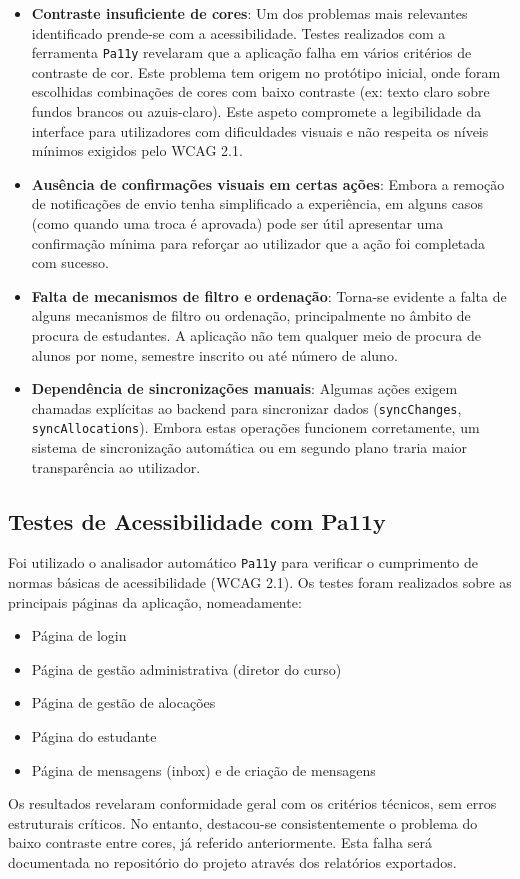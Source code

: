 \documentclass{article}
\begin{document}
\begin{itemize}
    \item \textbf{Contraste insuficiente de cores}: Um dos problemas mais relevantes identificado prende-se com a acessibilidade. Testes realizados com a ferramenta \texttt{Pa11y} revelaram que a aplicação falha em vários critérios de contraste de cor. Este problema tem origem no protótipo inicial, onde foram escolhidas combinações de cores com baixo contraste (ex: texto claro sobre fundos brancos ou azuis-claro). Este aspeto compromete a legibilidade da interface para utilizadores com dificuldades visuais e não respeita os níveis mínimos exigidos pelo WCAG 2.1.

    \item \textbf{Ausência de confirmações visuais em certas ações}: Embora a remoção de notificações de envio tenha simplificado a experiência, em alguns casos (como quando uma troca é aprovada) pode ser útil apresentar uma confirmação mínima para reforçar ao utilizador que a ação foi completada com sucesso.

    \item \textbf{Falta de mecanismos de filtro e ordenação}: Torna-se evidente a falta de alguns mecanismos de filtro ou ordenação, principalmente no âmbito de procura de estudantes. A aplicação não tem qualquer meio de procura de alunos por nome, semestre inscrito ou até número de aluno.

    \item \textbf{Dependência de sincronizações manuais}: Algumas ações exigem chamadas explícitas ao backend para sincronizar dados (\texttt{syncChanges}, \texttt{syncAllocations}). Embora estas operações funcionem corretamente, um sistema de sincronização automática ou em segundo plano traria maior transparência ao utilizador.
\end{itemize}

\subsection{Testes de Acessibilidade com Pa11y}

Foi utilizado o analisador automático \texttt{Pa11y} para verificar o cumprimento de normas básicas de acessibilidade (WCAG 2.1). Os testes foram realizados sobre as principais páginas da aplicação, nomeadamente:

\begin{itemize}
    \item Página de login
    \item Página de gestão administrativa (diretor do curso)
    \item Página de gestão de alocações
    \item Página do estudante
    \item Página de mensagens (inbox) e de criação de mensagens
\end{itemize}
Os resultados revelaram conformidade geral com os critérios técnicos, sem erros estruturais críticos. No entanto, destacou-se consistentemente o problema do baixo contraste entre cores, já referido anteriormente. Esta falha será documentada no repositório do projeto através dos relatórios exportados.
\end{document}
